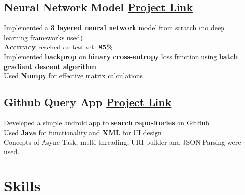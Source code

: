 \documentclass[]{Ankit-resume}
\begin{document}
\subsection{N\lowercase{eural} N\lowercase{etwork} M\lowercase{odel} \hfill \normalfont \href{https://github.com/ankitsharma1999/Neural-Network-Model}{P\lowercase{roject} L\lowercase{ink}}}
\vspace{2}
\textbullet{} Implemented a \textbf{3 layered neural network} model from scratch (no deep learning frameworks used) \\
\vspace{1}
\textbullet{} \textbf{Accuracy} reached on test set: \textbf{85\%} \\
\vspace{1}
\textbullet{} Implemented \textbf{backprop} on \textbf{binary cross-entropy} loss function using \textbf{batch gradient descent algorithm}\\
\vspace{1}
\textbullet{} Used \textbf{Numpy} for effective matrix calculations
\sectionsep

\subsection{G\lowercase{ithub} Q\lowercase{uery} A\lowercase{pp} \hfill \normalfont \href{https://github.com/ankitsharma1999/ud851-Sunshine}{P\lowercase{roject} L\lowercase{ink}}}
\vspace{2}
\textbullet{} Developed a simple android app to \textbf{search repositories} on GitHub \\
\vspace{1}
\textbullet{} Used \textbf{Java} for functionality and \textbf{XML} for UI design \\
\vspace{1}
\textbullet{} Concepts of Async Task, multi-threading, URI builder and JSON Parsing were used.\\
\hrulefill
\sectionsep



\section{Skills} 
\postsectionsep 
\vspace{\baselineskip}
\end{document}
